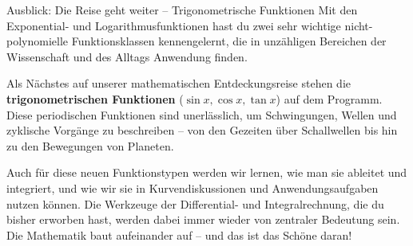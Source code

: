 \begin{infoboxumgebung}{Ausblick: Die Reise geht weiter – Trigonometrische Funktionen}
Mit den Exponential- und Logarithmusfunktionen hast du zwei sehr wichtige nicht-polynomielle Funktionsklassen kennengelernt, die in unzähligen Bereichen der Wissenschaft und des Alltags Anwendung finden.

Als Nächstes auf unserer mathematischen Entdeckungsreise stehen die \textbf{trigonometrischen Funktionen} ($\sin x, \cos x, \tan x$) auf dem Programm. Diese periodischen Funktionen sind unerlässlich, um Schwingungen, Wellen und zyklische Vorgänge zu beschreiben – von den Gezeiten über Schallwellen bis hin zu den Bewegungen von Planeten.

Auch für diese neuen Funktionstypen werden wir lernen, wie man sie ableitet und integriert, und wie wir sie in Kurvendiskussionen und Anwendungsaufgaben nutzen können. Die Werkzeuge der Differential- und Integralrechnung, die du bisher erworben hast, werden dabei immer wieder von zentraler Bedeutung sein. Die Mathematik baut aufeinander auf – und das ist das Schöne daran!
\end{infoboxumgebung}

